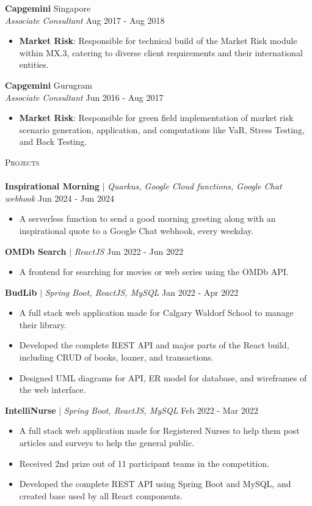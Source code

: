 \documentclass[a4paper]{article}
\newcommand{\lineunder} {
    \vspace*{-8pt} \\
    \hspace*{-18pt} \hrulefill \\
}
\newcommand{\header} [1] {
    \vspace*{5pt}
    {\hspace*{-18pt}\vspace*{6pt} \large\textsc{#1}}
    \vspace*{-6pt} \lineunder
}
\newcommand{\resumeHeadingExperience}[4]{
    \textbf{#1} \hfill {#2}\\
    \textit{#3} \hfill {#4}\\
    \vspace{-3mm}
}
\newcommand{\resumeItemExperience}[2]{
  \item{
    \begin{justify}
    \setlength{\rightskip}{0.15in} \textbf{#1}{: #2 \vspace{-2pt}}
    \end{justify}
  }
}
\newcommand{\resumeHeadingProject}[3]{
    \vspace{1mm}
    {\textbf{#1}} $|$ \emph{#2} \hfill {#3}
    \vspace{-2mm}
}
\newcommand{\resumeItemProject}[1]{
  \item{
    \begin{justify}
    \setlength{\rightskip}{0.15in} {#1 \vspace{-4pt}}
    \end{justify}
  }
}
\begin{document}
\resumeHeadingExperience {Capgemini} {Singapore} {Associate Consultant} {Aug 2017 - Aug 2018}
\begin{itemize} \itemsep 1pt
    \resumeItemExperience{Market Risk} {Responsible for technical build of the Market Risk module within MX.3, catering to diverse client requirements and their international entities.}
\end{itemize}

\resumeHeadingExperience {Capgemini} {Gurugram} {Associate Consultant} {Jun 2016 - Aug 2017}
\begin{itemize} \itemsep 1pt
    \resumeItemExperience{Market Risk} {Responsible for green field implementation of market risk scenario generation, application, and computations like VaR, Stress Testing, and Back Testing.}
\end{itemize}


\header{Projects}

\resumeHeadingProject {Inspirational Morning} {Quarkus, Google Cloud functions, Google Chat webhook} {Jun 2024 - Jun 2024}
\begin{itemize}
    \resumeItemProject {A serverless function to send a good morning greeting along with an inspirational quote to a Google Chat webhook, every weekday.}
\end{itemize}

\resumeHeadingProject {OMDb Search} {ReactJS} {Jun 2022 - Jun 2022}
\begin{itemize}
    \resumeItemProject {A frontend for searching for movies or web series using the OMDb API.}
\end{itemize}

\resumeHeadingProject {BudLib} {Spring Boot, ReactJS, MySQL} {Jan 2022 - Apr 2022}
\begin{itemize}
    \resumeItemProject {A full stack web application made for Calgary Waldorf School to manage their library.}
    \resumeItemProject {Developed the complete REST API and major parts of the React build, including CRUD of books, loaner, and transactions.}
    \resumeItemProject {Designed UML diagrams for API, ER model for database, and wireframes of the web interface.}
\end{itemize}

\resumeHeadingProject {IntelliNurse} {Spring Boot, ReactJS, MySQL} {Feb 2022 - Mar 2022}
\begin{itemize}
    \resumeItemProject {A full stack web application made for Registered Nurses to help them post articles and surveys to help the general public.}
    \resumeItemProject {Received 2nd prize out of 11 participant teams in the competition.}
    \resumeItemProject {Developed the complete REST API using Spring Boot and MySQL, and created base used by all React components.}
\end{itemize}
\end{document}
